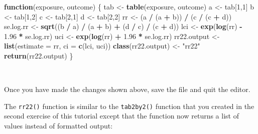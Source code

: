 \documentclass[12pt,a4paper]{book}
\newenvironment{Shaded}{\begin{snugshade}}{\end{snugshade}}
\newcommand{\KeywordTok}[1]{\textcolor[rgb]{0.13,0.29,0.53}{\textbf{#1}}}
\newcommand{\DataTypeTok}[1]{\textcolor[rgb]{0.13,0.29,0.53}{#1}}
\newcommand{\DecValTok}[1]{\textcolor[rgb]{0.00,0.00,0.81}{#1}}
\newcommand{\FloatTok}[1]{\textcolor[rgb]{0.00,0.00,0.81}{#1}}
\newcommand{\StringTok}[1]{\textcolor[rgb]{0.31,0.60,0.02}{#1}}
\newcommand{\ControlFlowTok}[1]{\textcolor[rgb]{0.13,0.29,0.53}{\textbf{#1}}}
\newcommand{\OperatorTok}[1]{\textcolor[rgb]{0.81,0.36,0.00}{\textbf{#1}}}
\newcommand{\NormalTok}[1]{#1}
\theoremstyle{definition}
\theoremstyle{definition}
\theoremstyle{definition}
\theoremstyle{remark}
\begin{document}
\begin{Shaded}
\begin{Highlighting}[]
\ControlFlowTok{function}\NormalTok{(exposure, outcome) \{}
\NormalTok{  tab <-}\StringTok{ }\KeywordTok{table}\NormalTok{(exposure, outcome)}
\NormalTok{  a <-}\StringTok{ }\NormalTok{tab[}\DecValTok{1}\NormalTok{,}\DecValTok{1}\NormalTok{]}
\NormalTok{  b <-}\StringTok{ }\NormalTok{tab[}\DecValTok{1}\NormalTok{,}\DecValTok{2}\NormalTok{]}
\NormalTok{  c <-}\StringTok{ }\NormalTok{tab[}\DecValTok{2}\NormalTok{,}\DecValTok{1}\NormalTok{]}
\NormalTok{  d <-}\StringTok{ }\NormalTok{tab[}\DecValTok{2}\NormalTok{,}\DecValTok{2}\NormalTok{]}
\NormalTok{  rr <-}\StringTok{ }\NormalTok{(a }\OperatorTok{/}\StringTok{ }\NormalTok{(a }\OperatorTok{+}\StringTok{ }\NormalTok{b)) }\OperatorTok{/}\StringTok{ }\NormalTok{(c }\OperatorTok{/}\StringTok{ }\NormalTok{(c }\OperatorTok{+}\StringTok{ }\NormalTok{d))}
\NormalTok{  se.log.rr <-}\StringTok{ }\KeywordTok{sqrt}\NormalTok{((b }\OperatorTok{/}\StringTok{ }\NormalTok{a) }\OperatorTok{/}\StringTok{ }\NormalTok{(a }\OperatorTok{+}\StringTok{ }\NormalTok{b) }\OperatorTok{+}\StringTok{ }\NormalTok{(d }\OperatorTok{/}\StringTok{ }\NormalTok{c) }\OperatorTok{/}\StringTok{ }\NormalTok{(c }\OperatorTok{+}\StringTok{ }\NormalTok{d))}
\NormalTok{  lci <-}\StringTok{ }\KeywordTok{exp}\NormalTok{(}\KeywordTok{log}\NormalTok{(rr) }\OperatorTok{-}\StringTok{ }\FloatTok{1.96} \OperatorTok{*}\StringTok{ }\NormalTok{se.log.rr)}
\NormalTok{  uci <-}\StringTok{ }\KeywordTok{exp}\NormalTok{(}\KeywordTok{log}\NormalTok{(rr) }\OperatorTok{+}\StringTok{ }\FloatTok{1.96} \OperatorTok{*}\StringTok{ }\NormalTok{se.log.rr)}
\NormalTok{  rr22.output <-}\StringTok{ }\KeywordTok{list}\NormalTok{(}\DataTypeTok{estimate =}\NormalTok{ rr, }\DataTypeTok{ci =} \KeywordTok{c}\NormalTok{(lci, uci))}
  \KeywordTok{class}\NormalTok{(rr22.output) <-}\StringTok{ "rr22"}
  \KeywordTok{return}\NormalTok{(rr22.output)}
\NormalTok{\}}
\end{Highlighting}
\end{Shaded}

~

Once you have made the changes shown above, save the file and quit the
editor.

The \texttt{rr22()} function is similar to the \texttt{tab2by2()}
function that you created in the second exercise of this tutorial except
that the function now returns a list of values instead of formatted
output:

~
\end{document}
